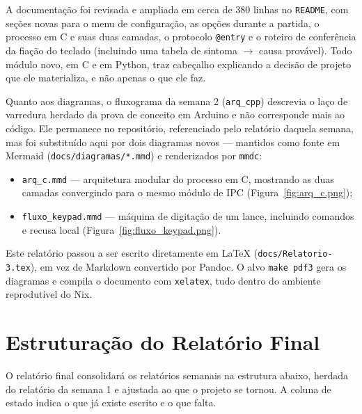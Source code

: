 \documentclass[12pt,a4paper]{article}
\begin{document}
A documentação foi revisada e ampliada em cerca de 380 linhas no
\texttt{README}, com seções novas para o menu de configuração, as opções
durante a partida, o processo em C e suas duas camadas, o protocolo
\texttt{@entry} e o roteiro de conferência da fiação do teclado (incluindo uma
tabela de sintoma $\to$ causa provável). Todo módulo novo, em C e em Python,
traz cabeçalho explicando a decisão de projeto que ele materializa, e não
apenas o que ele faz.

Quanto aos diagramas, o fluxograma da semana 2 (\texttt{arq\_cpp}) descrevia o
laço de varredura herdado da prova de conceito em Arduino e não corresponde
mais ao código. Ele permanece no repositório, referenciado pelo relatório
daquela semana, mas foi substituído aqui por dois diagramas novos --- mantidos
como fonte em Mermaid (\texttt{docs/diagramas/*.mmd}) e renderizados por
\texttt{mmdc}:

\begin{itemize}
  \item \texttt{arq\_c.mmd} --- arquitetura modular do processo em C, mostrando
        as duas camadas convergindo para o mesmo módulo de IPC
        (Figura~\ref{fig:arq_c.png});
  \item \texttt{fluxo\_keypad.mmd} --- máquina de digitação de um lance,
        incluindo comandos e recusa local (Figura~\ref{fig:fluxo_keypad.png}).
\end{itemize}

Este relatório passou a ser escrito diretamente em \LaTeX{}
(\texttt{docs/Relatorio-3.tex}), em vez de Markdown convertido por Pandoc. O
alvo \texttt{make pdf3} gera os diagramas e compila o documento com
\texttt{xelatex}, tudo dentro do ambiente reprodutível do Nix.

\section{Estruturação do Relatório Final}

O relatório final consolidará os relatórios semanais na estrutura abaixo,
herdada do relatório da semana 1 e ajustada ao que o projeto se tornou. A
coluna de estado indica o que já existe escrito e o que falta.
\end{document}
